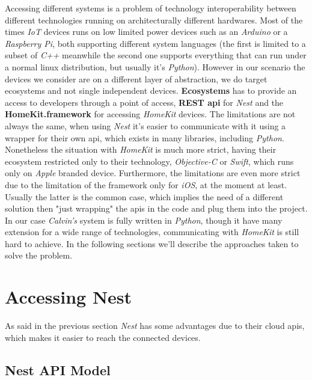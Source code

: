 Accessing different systems is a problem of technology interoperability between
different technologies running on architecturally different hardwares.
Most of the times \textit{IoT} devices runs on low limited power devices such as
an \textit{Arduino} or a \textit{Raspberry Pi}, both supporting different system
languages (the first is limited to a subset of \textit{C++} meanwhile the second one supports everything
that can run under a normal linux distribution, but usually it's \textit{Python}).
However in our scenario the devices we consider are on a different layer of abstraction,
we do target ecosystems and not single independent devices. \textbf{Ecosystems} has to
provide an access to developers through a point of access, \textbf{REST api} for   \textit{Nest}
and the \textbf{HomeKit.framework} for accessing \textit{HomeKit} devices.
The limitations are not always the same, when using \textit{Nest} it's easier to communicate
with it using a wrapper for their own api, which exists in many libraries, including \textit{Python}.
Nonetheless the situation with \textit{HomeKit} is much more strict, having their ecosystem
restricted only to their technology, \textit{Objective-C} or \textit{Swift}, which runs only
on \textit{Apple} branded device. Furthermore, the limitations are even more strict
due to the limitation of the framework only for \textit{iOS}, at the moment at least.
Usually the latter is the common case, which implies the need of a different solution
then "just wrapping" the apis in the code and plug them into the project.
In our case \textit{Calvin's} system is fully written in \textit{Python},
though it have many extension for a wide range of technologies, communicating
with \textit{HomeKit} is still hard to achieve.
In the following sections we'll describe the approaches taken to solve
the problem.




\section{Accessing Nest}

As said in the previous section \textit{Nest} has some advantages
due to their cloud apis, which makes it easier to reach the connected devices.

\subsection{Nest API Model}

